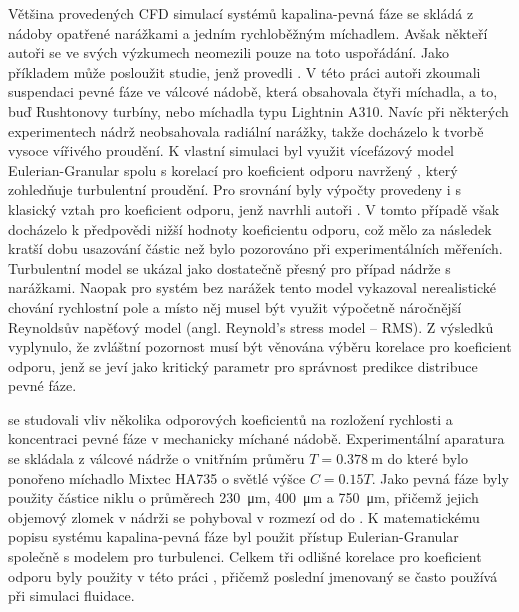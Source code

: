 Většina provedených CFD simulací systémů kapalina-pevná fáze se skládá z nádoby opatřené narážkami a jedním rychloběžným míchadlem. Avšak někteří autoři se ve svých výzkumech neomezili pouze na toto uspořádání. Jako příkladem může posloužit studie, jenž provedli \citet{mon04}. V této práci autoři zkoumali suspendaci pevné fáze ve válcové nádobě, která obsahovala čtyři míchadla, a to, buď Rushtonovy turbíny, nebo míchadla typu Lightnin A310. Navíc při některých experimentech nádrž neobsahovala radiální narážky, takže docházelo k tvorbě vysoce vířivého proudění. K vlastní simulaci byl využit vícefázový model Eulerian-Granular spolu s korelací pro koeficient odporu navržený \citet{pin01}, který zohledňuje turbulentní proudění. Pro srovnání byly výpočty provedeny i s klasický vztah pro koeficient odporu, jenž navrhli autoři \citet{schi32}. V tomto případě však docházelo k předpovědi nižší hodnoty koeficientu odporu, což mělo za následek kratší dobu usazování částic než bylo pozorováno při experimentálních měřeních. Turbulentní model \keps{} se ukázal jako dostatečně přesný pro případ nádrže s narážkami. Naopak pro systém bez narážek tento model vykazoval nerealistické chování rychlostní pole a místo něj musel být využit výpočetně náročnější Reynoldsův napěťový model (angl. Reynold's stress model -- RMS). Z výsledků vyplynulo, že zvláštní pozornost musí být věnována výběru korelace pro koeficient odporu, jenž se jeví jako kritický parametr pro správnost predikce distribuce pevné fáze.   

\citet{ochi08} se studovali vliv několika odporových koeficientů na rozložení rychlosti a koncentraci pevné fáze v mechanicky míchané nádobě. Experimentální aparatura se skládala z válcové nádrže o vnitřním průměru $T=\SI{0.378}{\meter}$ do které bylo ponořeno míchadlo Mixtec HA735 o světlé výšce $C=\num{0.15}T$. Jako pevná fáze byly použity částice niklu o průměrech \SI{230}{\micro\meter}, \SI{400}{\micro\meter} a \SI{750}{\micro\meter}, přičemž jejich objemový zlomek v nádrži se pohyboval v rozmezí od  do . K matematickému popisu systému kapalina-pevná fáze byl použit přístup Eulerian-Granular společně s modelem \keps{} pro turbulenci. Celkem tři odlišné korelace pro koeficient odporu byly použity v této práci \citep{schi32, bru98, gid94}, přičemž poslední jmenovaný se často používá při simulaci fluidace. 

   
